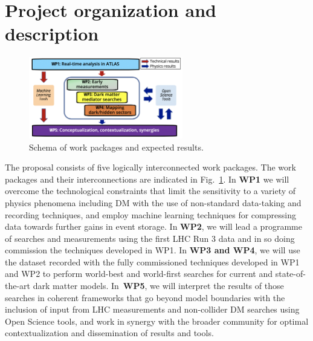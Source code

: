 \documentclass[11pt,a4paper]{article}
\begin{document}

\section{Project organization and description} 
\smallskip


\begin{figure} 
\begin{center}
\includegraphics[width=0.6\textwidth]{figs/WPs_shorter}
\caption{\label{fig:WPs} \footnotesize Schema of work packages and expected results.
}
\end{center}

\vskip10pt
\end{figure}

The proposal consists of five logically interconnected work packages.
The work packages and their interconnections are indicated in Fig.~\ref{fig:WPs}. 
In \textbf{WP1} we will overcome the technological constraints that limit the sensitivity to a variety of physics phenomena including DM with the use of non-standard data-taking and recording techniques, and employ machine learning techniques for compressing data towards further gains in event storage.  
In \textbf{WP2}, we will lead a programme of searches and measurements using the first LHC Run 3 data and in so doing commission the techniques developed in WP1. 
In \textbf{WP3 and WP4}, we will use the dataset recorded with the fully commissioned techniques developed in WP1 and WP2 to perform world-best and world-first searches for current and state-of-the-art dark matter models. 
In~\textbf{WP5}, we will interpret the results of those searches in coherent frameworks that go beyond model boundaries with the inclusion of input from LHC measurements and non-collider DM searches using Open Science tools, and work in synergy with the broader community for optimal contextualization and dissemination of results and tools. %
\end{document}

